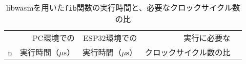 \begin{table}[htbp]
  \caption{libwasmを用いた{\tt fib}関数の実行時間と、必要なクロックサイクル数の比}
  \label{tab:fib_time}
  \begin{center}
    \begin{tabular}{rrrrr}
      \hline
         & PC環境での & ESP32環境での & 実行に必要な \\
       n & 実行時間（$\mu$s） & 実行時間（$\mu$s） & クロックサイクル数の比 \\ \hline \hline

\end{tabular}
\end{center}
\end{table}
